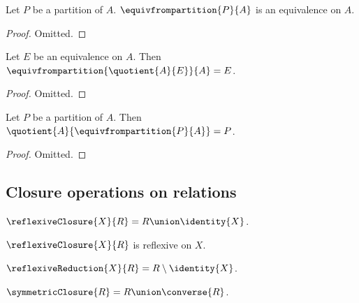 \begin{proposition}\label{equivalence_from_partition_is_equivalence}
    Let $P$ be a partition of $A$.
    $\equivfrompartition{P}{A}$ is an equivalence on $A$.
\end{proposition}
\begin{proof}
    Omitted.
\end{proof}

\begin{proposition}\label{equivalence_from_quotient}
    Let $E$ be an equivalence on $A$.
    Then $\equivfrompartition{\quotient{A}{E}}{A} = E$.
\end{proposition}
\begin{proof}
    Omitted.
\end{proof}

\begin{proposition}\label{partition_eq_quotient_by_equivalence_from_partition}
    Let $P$ be a partition of $A$.
    Then $\quotient{A}{\equivfrompartition{P}{A}} = P$.
\end{proposition}
\begin{proof}
    Omitted.
\end{proof}
\subsection{Closure operations on relations}

\begin{definition}\label{reflexive_closure}
    $\reflexiveClosure{X}{R} = R\union\identity{X}$.
\end{definition}

\begin{proposition}\label{reflexive_closure_is_reflexive}
    $\reflexiveClosure{X}{R}$ is reflexive on $X$.
\end{proposition}

\begin{definition}\label{reflexive_reduction}
    $\reflexiveReduction{X}{R} = R\setminus\identity{X}$.
\end{definition}

\begin{definition}\label{symmetric_closure}
    $\symmetricClosure{R} = R\union\converse{R}$.
\end{definition}




